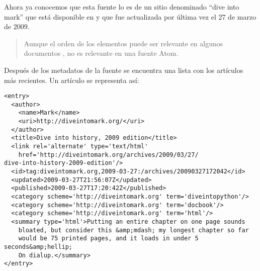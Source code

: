 Ahora ya conocemos que esta fuente lo es de un sitio denominado ``dive into mark'' que está disponible en  y que fue actualizada por última vez el 27 de marzo de 2009.

\begin{quote}
Aunque el orden de los elementos puede ser relevante en algunos documentos , no es relevante en una fuente Atom.
\end{quote}

Después de los metadatos de la fuente se encuentra una lista con los artículos más recientes. Un artículo se representa así:

\noindent\begin{minipage}{\textwidth}
\begin{lstlisting}[mathescape=True]
<entry>
  <author>
    <name>Mark</name>
    <uri>http://diveintomark.org/</uri>
  </author>
  <title>Dive into history, 2009 edition</title>
  <link rel='alternate' type='text/html'     
    href='http://diveintomark.org/archives/2009/03/27/
dive-into-history-2009-edition'/>
  <id>tag:diveintomark.org,2009-03-27:/archives/20090327172042</id>
  <updated>2009-03-27T21:56:07Z</updated>     
  <published>2009-03-27T17:20:42Z</published>        
  <category scheme='http://diveintomark.org' term='diveintopython'/>
  <category scheme='http://diveintomark.org' term='docbook'/>
  <category scheme='http://diveintomark.org' term='html'/>
  <summary type='html'>Putting an entire chapter on one page sounds
    bloated, but consider this &amp;mdash; my longest chapter so far
    would be 75 printed pages, and it loads in under 5 seconds&amp;hellip;
    On dialup.</summary>
</entry>             
\end{lstlisting}
\end{minipage}

